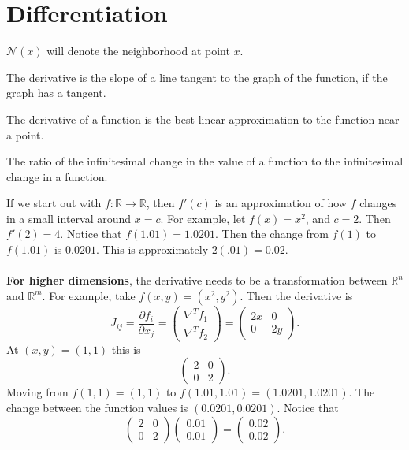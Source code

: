 \chapter{Differentiation}
$\mathcal N(x)$ will denote the neighborhood at point $x$. 
\begin{defn}[Geometric]
The derivative is the slope of a line tangent to the graph of the
function, if the graph has a tangent.
\end{defn}

\begin{defn}[Approximation]
The derivative of a function is the best linear approximation to the function near a point.
\end{defn}

\begin{defn}[Infinitesimal]
The ratio of the infinitesimal change in the value of a function to the infinitesimal change in a function.
\end{defn}
If we start out with $f:\mathbb{R}\to\mathbb{R}$, then $f'(c)$ is an approximation of how $f$ changes in a small interval around $x=c$.  For example, let $f(x)=x^2$, and $c=2$.  Then $f'(2)=4$.  Notice that $f(1.01)=1.0201$.  Then the change from $f(1)$ to $f(1.01)$ is $0.0201$.  This is approximately $2(.01)=0.02$.  
\\~\\
\textbf{For higher dimensions}, the derivative needs to be a transformation between $\mathbb{R}^n$ and $\mathbb{R}^m$.  For example, take $f(x,y)=(x^2,y^2)$.  Then the derivative is
$$
J_{ij}=\frac{\partial f_i}{\partial x_j}=\begin{pmatrix}
    \nabla^T f_1\\\nabla^T f_2
\end{pmatrix}=\begin{pmatrix}
2x & 0 \\ 0 & 2y
\end{pmatrix}.
$$
At $(x,y)=(1,1)$ this is
$$
\begin{pmatrix}
2 & 0 \\ 0 & 2
\end{pmatrix}.
$$
Moving from $f(1,1)=(1,1)$ to $f(1.01,1.01)=(1.0201,1.0201)$. The change between the function values is $(0.0201,0.0201)$.  Notice that
$$
\begin{pmatrix}
2 & 0 \\ 0 & 2
\end{pmatrix}
\begin{pmatrix}
0.01 \\ 0.01
\end{pmatrix}
=
\begin{pmatrix}
0.02 \\ 0.02
\end{pmatrix}.
$$
